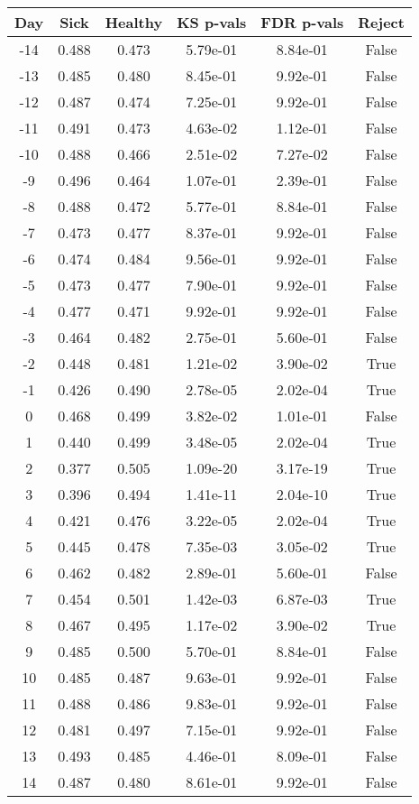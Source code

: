 \begin{tabular}{c|c|c|c|c|c}
Day &  Sick & Healthy &  KS p-vals & FDR p-vals & Reject\\
\hline
-14 & 0.488 &   0.473 &   5.79e-01 &   8.84e-01 &  False\\
-13 & 0.485 &   0.480 &   8.45e-01 &   9.92e-01 &  False\\
-12 & 0.487 &   0.474 &   7.25e-01 &   9.92e-01 &  False\\
-11 & 0.491 &   0.473 &   4.63e-02 &   1.12e-01 &  False\\
-10 & 0.488 &   0.466 &   2.51e-02 &   7.27e-02 &  False\\
 -9 & 0.496 &   0.464 &   1.07e-01 &   2.39e-01 &  False\\
 -8 & 0.488 &   0.472 &   5.77e-01 &   8.84e-01 &  False\\
 -7 & 0.473 &   0.477 &   8.37e-01 &   9.92e-01 &  False\\
 -6 & 0.474 &   0.484 &   9.56e-01 &   9.92e-01 &  False\\
 -5 & 0.473 &   0.477 &   7.90e-01 &   9.92e-01 &  False\\
 -4 & 0.477 &   0.471 &   9.92e-01 &   9.92e-01 &  False\\
 -3 & 0.464 &   0.482 &   2.75e-01 &   5.60e-01 &  False\\
 -2 & 0.448 &   0.481 &   1.21e-02 &   3.90e-02 &   True\\
 -1 & 0.426 &   0.490 &   2.78e-05 &   2.02e-04 &   True\\
  0 & 0.468 &   0.499 &   3.82e-02 &   1.01e-01 &  False\\
  1 & 0.440 &   0.499 &   3.48e-05 &   2.02e-04 &   True\\
  2 & 0.377 &   0.505 &   1.09e-20 &   3.17e-19 &   True\\
  3 & 0.396 &   0.494 &   1.41e-11 &   2.04e-10 &   True\\
  4 & 0.421 &   0.476 &   3.22e-05 &   2.02e-04 &   True\\
  5 & 0.445 &   0.478 &   7.35e-03 &   3.05e-02 &   True\\
  6 & 0.462 &   0.482 &   2.89e-01 &   5.60e-01 &  False\\
  7 & 0.454 &   0.501 &   1.42e-03 &   6.87e-03 &   True\\
  8 & 0.467 &   0.495 &   1.17e-02 &   3.90e-02 &   True\\
  9 & 0.485 &   0.500 &   5.70e-01 &   8.84e-01 &  False\\
 10 & 0.485 &   0.487 &   9.63e-01 &   9.92e-01 &  False\\
 11 & 0.488 &   0.486 &   9.83e-01 &   9.92e-01 &  False\\
 12 & 0.481 &   0.497 &   7.15e-01 &   9.92e-01 &  False\\
 13 & 0.493 &   0.485 &   4.46e-01 &   8.09e-01 &  False\\
 14 & 0.487 &   0.480 &   8.61e-01 &   9.92e-01 &  False\\
\end{tabular}